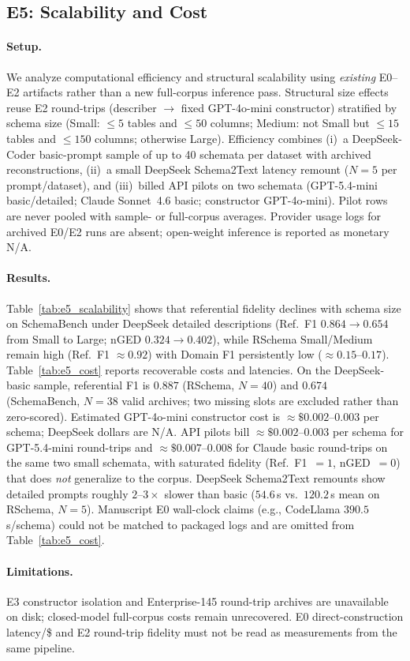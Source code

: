 \subsection{E5: Scalability and Cost}
\label{sec:e5}

\paragraph{Setup.}
We analyze computational efficiency and structural scalability using
\emph{existing} E0--E2 artifacts rather than a new full-corpus inference pass.
Structural size effects reuse E2 round-trips (describer $\rightarrow$ fixed
GPT-4o-mini constructor) stratified by schema size
(Small: ${\le}5$ tables and ${\le}50$ columns; Medium: not Small but
${\le}15$ tables and ${\le}150$ columns; otherwise Large).
Efficiency combines (i)~a DeepSeek-Coder basic-prompt sample of up to 40
schemata per dataset with archived reconstructions,
(ii)~a small DeepSeek Schema2Text latency remount ($N{=}5$ per prompt/dataset),
and (iii)~billed API pilots on two schemata
(GPT-5.4-mini basic/detailed; Claude Sonnet~4.6 basic; constructor GPT-4o-mini).
Pilot rows are never pooled with sample- or full-corpus averages.
Provider usage logs for archived E0/E2 runs are absent; open-weight inference
is reported as monetary N/A.

\paragraph{Results.}
Table~\ref{tab:e5_scalability} shows that referential fidelity declines with
schema size on SchemaBench under DeepSeek detailed descriptions
(Ref.\ F1 $0.864\rightarrow0.654$ from Small to Large; nGED
$0.324\rightarrow0.402$), while RSchema Small/Medium remain high
(Ref.\ F1 ${\approx}0.92$) with Domain F1 persistently low (${\approx}0.15$--$0.17$).
Table~\ref{tab:e5_cost} reports recoverable costs and latencies.
On the DeepSeek-basic sample, referential F1 is $0.887$ (RSchema, $N{=}40$) and
$0.674$ (SchemaBench, $N{=}38$ valid archives; two missing slots are excluded
rather than zero-scored).
Estimated GPT-4o-mini constructor cost is ${\approx}\$0.002$--$0.003$ per schema;
DeepSeek dollars are N/A.
API pilots bill ${\approx}\$0.002$--$0.003$ per schema for GPT-5.4-mini round-trips
and ${\approx}\$0.007$--$0.008$ for Claude basic round-trips on the same two
small schemata, with saturated fidelity (Ref.\ F1~$=1$, nGED~$=0$) that does
\emph{not} generalize to the corpus.
DeepSeek Schema2Text remounts show detailed prompts roughly $2$--$3\times$
slower than basic ($54.6$\,s vs.\ $120.2$\,s mean on RSchema, $N{=}5$).
Manuscript E0 wall-clock claims (e.g., CodeLlama $390.5$\,s/schema) could not
be matched to packaged logs and are omitted from Table~\ref{tab:e5_cost}.

\paragraph{Limitations.}
E3 constructor isolation and Enterprise-145 round-trip archives are unavailable
on disk; closed-model full-corpus costs remain unrecovered.
E0 direct-construction latency/\$ and E2 round-trip fidelity must not be read
as measurements from the same pipeline.
